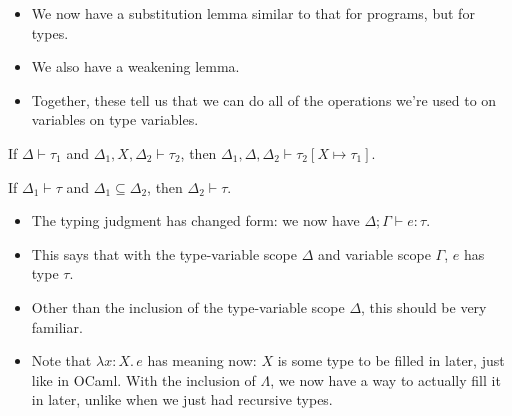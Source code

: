 \documentclass{lecturenotes}
\newcommand{\tabs}[3]{\ensuremath{\lambda #1 \colon #2.\,#3}}
\newcommand{\app}[2]{\ensuremath{#1\;#2}}
\newcommand{\fatype}[2]{\ensuremath{\forall #1.\,#2}}
\newcommand{\Abs}[2]{\Lambda #1.\,#2}
\newcommand{\App}[2]{#1\;[#2]}
\begin{document}
\begin{itemize}
\item We now have a substitution lemma similar to that for programs, but for types.
\item We also have a weakening lemma.
\item Together, these tell us that we can do all of the operations we're used to on variables on type variables.
\end{itemize}

\begin{thm}[Substitution]
  If $\Delta \vdash \tau_1$ and $\Delta_1, X, \Delta_2 \vdash \tau_2$, then $\Delta_1, \Delta, \Delta_2 \vdash \tau_2[X \mapsto \tau_1]$.
\end{thm}

\begin{thm}[Weakening]
  If $\Delta_1 \vdash \tau$ and $\Delta_1 \subseteq \Delta_2$, then $\Delta_2 \vdash \tau$.
\end{thm}

\begin{itemize}
\item The typing judgment has changed form: we now have $\Delta; \Gamma \vdash e : \tau$.
\item This says that with the type-variable scope $\Delta$ and variable scope $\Gamma$, $e$ has type $\tau$.
\item Other than the inclusion of the type-variable scope $\Delta$, this should be very familiar.
\item Note that $\tabs{x}{X}{e}$ has meaning now: $X$ is some type to be filled in later, just like in OCaml.
  With the inclusion of $\Lambda$, we now have a way to actually fill it in later, unlike when we just had recursive types.
\end{itemize}

\end{document}
